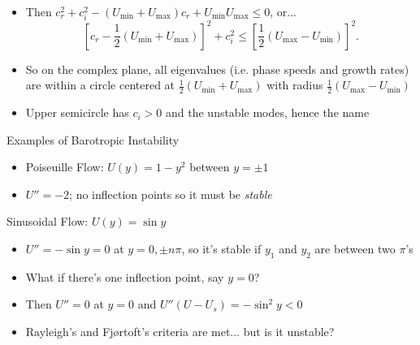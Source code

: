 \documentclass[landscape]{seminar}
\begin{document}
\begin{slide}

\begin{itemize}
  \item Then $c_r^2 + c_i^2 - (U_{\min} + U_{\max})c_r + U_{\min} U_{\max} \leq 0$, or...
\begin{equation}
\left[c_r - \frac{1}{2}(U_{\min} + U_{\max}) \right]^2 + c_i^2 \leq \left[\frac{1}{2}(U_{\max} - U_{\min}) \right]^2.
\end{equation}

  \item So on the complex plane, all eigenvalues (i.e. phase speeds and growth rates) are within a circle centered at $\frac{1}{2}(U_{\min} + U_{\max})$ with radius $\frac{1}{2}(U_{\max} - U_{\min})$

  \item Upper semicircle has $c_i > 0$ and the unstable modes, hence the name

\end{itemize}

\end{slide}
\begin{slide}

\begin{center}Examples of Barotropic Instability\end{center}

\begin{itemize}
  \item Poiseuille Flow: $U(y) = 1 - y^2$ between $y = \pm 1$

  \item $U'' = -2$; no inflection points so it must be \emph{stable}
\end{itemize}

\end{slide}
\begin{slide}

\begin{center}Sinusoidal Flow: $U(y) = \sin y$\end{center}

\begin{itemize}
  \item $U'' = - \sin y = 0$ at $y = 0, \pm n \pi$, so it's stable if $y_1$ and $y_2$ are between two $\pi$'s

  \item What if there's one inflection point, say $y = 0$?

  \item Then $U'' = 0$ at $y =0$ and $U'' (U - U_s) = -\sin^2 y < 0$

  \item Rayleigh's and Fj\o rtoft's criteria are met... but is it unstable?
\end{itemize}

\end{slide}
\end{document}
